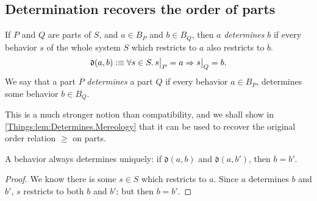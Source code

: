 \begin{ex}
\begin{itemize}
\end{itemize}
\end{ex}

\subsection{Determination recovers the order of parts}
\begin{defn}\label{defn:determines}
If $P$ and $Q$ are parts of $S$, and $a \in B_P$ and $b \in B_Q$, then $a$ \emph{determines} $b$ if every behavior $s$ of the whole system $S$ which restricts to $a$ also restricts to $b$.
$$\mathfrak{d}(a, b) :\equiv \forall s \in S.\, s\big|_{P} = a \Rightarrow s\big|_{Q} = b.$$
We say that a part $P$ \emph{determines} a part $Q$ if every behavior $a \in B_P$, determines some behavior $b \in B_Q$. 
\end{defn}

This is a much stronger notion than compatibility, and we shall show in \cref{Things:lem:Determines.Mereology} that it can be used to recover the original order relation $\geq$ on parts.

\begin{lemma}
A behavior always determines uniquely: if $\mathfrak{d}(a, b)$ and $\mathfrak{d}(a, b')$, then $b = b'$.
\end{lemma}
\begin{proof}
We know there is some $s \in S$ which restricts to $a$. Since $a$ determines $b$ and $b'$, $s$ restricts to both $b$ and $b'$; but then $b = b'$.
\end{proof}


